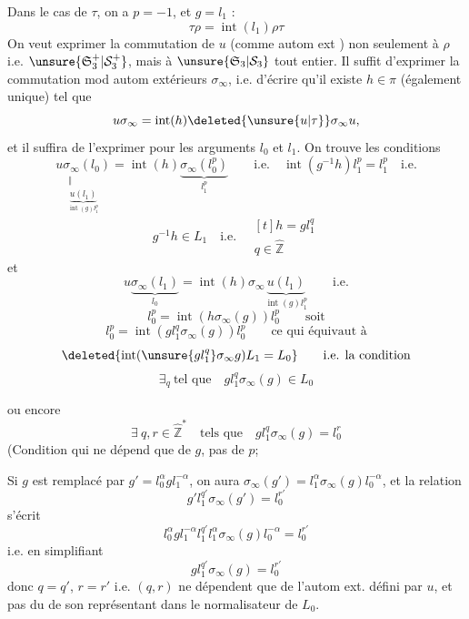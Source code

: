 Dans le cas de $\tau$, on a $p=-1$, et $g=l_1$ :
\[
\tau\rho=\operatorname{int}(l_1)\rho\tau
\]
On veut exprimer la commutation de $u$ (comme autom ext ) non seulement à $\rho$ i.e. $\unsure{\mathfrak S_3^+|\mathcal S_3^+}$,
mais à $\unsure{\mathfrak S_3|\mathcal S_3}$ tout entier. Il suffit d'exprimer la commutation mod autom extérieurs  $\sigma_\infty$, i.e. d'écrire qu'il existe $h\in\pi$ (également unique) tel que
\[
u\sigma_\infty=\operatorname{int}(h)\deleted{\unsure{u|\tau}}\sigma_\infty u,
\]
et il suffira de l'exprimer pour les arguments $l_0$ et $l_1$. On trouve les conditions
\[
\underset{\substack{\Vert\\\underbrace{u(l_1)}_{\operatorname{int}(g)l_1^p}}}{u\sigma_\infty(l_0)}=\operatorname{int}(h)\underbrace{\sigma_\infty(l_0^p)}_{l_1^p}
\qquad\text{i.e.}\quad\operatorname{int}(g^{-1}h)l_1^p=l_1^p\quad\text{i.e.}
\]
\[
g^{-1}h\in L_1\quad\text{i.e.}\quad \begin{gathered}[t]h=gl_1^q\\q\in\hat{\mathbb Z}\end{gathered}
\]
et
\[
u\underbrace{\sigma_\infty(l_1)}_{l_0}=\operatorname{int}(h)\sigma_\infty\underbrace{u(l_1)}_{\operatorname{int}(g)l_1^p}\qquad\text{i.e.}
\]
\[
l_0^p=\operatorname{int}(h\sigma_\infty(g))l_0^p\qquad\text{soit}
\]
\[
l_0^p=\operatorname{int}(gl_1^q\sigma_\infty(g))l_0^p\qquad\text{ce qui équivaut à}
\]
\[
\deleted{\operatorname{int}(\unsure{gl_1^q}\sigma_\infty g)L_1=L_0}\qquad\text{i.e. la condition}
\]
\[
\exists_q\ \text{tel que}\quad gl_1^q\sigma_\infty(g)\in L_0
\]

ou encore
\[
\exists\ q,r\in\hat{\mathbb Z}^{*}\quad\text{tels que}\quad\boxed{gl_1^q\sigma_\infty(g)=l_0^r}
\]
(Condition qui ne dépend que de $g$, pas de $p$;

Si $g$ est remplacé par $g'=l_0^\alpha gl_1^{-\alpha}$, on aura $\sigma_\infty(g')=l_1^\alpha\sigma_\infty(g)l_0^{-\alpha}$, et la relation
\[
g'l_1^{q'}\sigma_\infty(g')=l_0^{r'}
\]
s'écrit
\[
l_0^\alpha gl_1^{-\alpha}l_1^{q'}l_1^\alpha\sigma_\infty(g)l_0^{-\alpha}=l_0^{r'}
\]
i.e. en simplifiant
\[
gl_1^{q'}\sigma_\infty(g)=l_0^{r'}
\]
donc $q=q'$, $r=r'$ i.e. $(q,r)$ ne dépendent que de l'autom ext. défini par $u$, et pas du  de son représentant dans le normalisateur de $L_0$.

